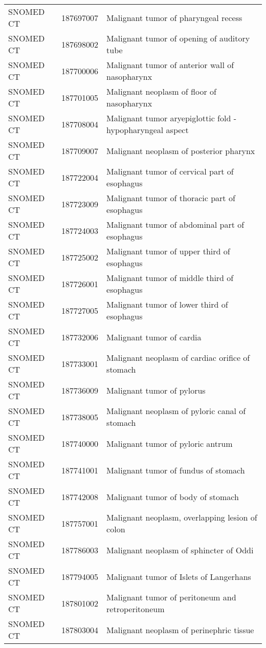 \begin{longtable}{p{}p{}p{}}
  SNOMED CT & 187697007 & Malignant tumor of pharyngeal recess \\ 
  SNOMED CT & 187698002 & Malignant tumor of opening of auditory tube \\ 
  SNOMED CT & 187700006 & Malignant tumor of anterior wall of nasopharynx \\ 
  SNOMED CT & 187701005 & Malignant neoplasm of floor of nasopharynx \\ 
  SNOMED CT & 187708004 & Malignant tumor aryepiglottic fold - hypopharyngeal aspect \\ 
  SNOMED CT & 187709007 & Malignant neoplasm of posterior pharynx \\ 
  SNOMED CT & 187722004 & Malignant tumor of cervical part of esophagus \\ 
  SNOMED CT & 187723009 & Malignant tumor of thoracic part of esophagus \\ 
  SNOMED CT & 187724003 & Malignant tumor of abdominal part of esophagus \\ 
  SNOMED CT & 187725002 & Malignant tumor of upper third of esophagus \\ 
  SNOMED CT & 187726001 & Malignant tumor of middle third of esophagus \\ 
  SNOMED CT & 187727005 & Malignant tumor of lower third of esophagus \\ 
  SNOMED CT & 187732006 & Malignant tumor of cardia \\ 
  SNOMED CT & 187733001 & Malignant neoplasm of cardiac orifice of stomach \\ 
  SNOMED CT & 187736009 & Malignant tumor of pylorus \\ 
  SNOMED CT & 187738005 & Malignant neoplasm of pyloric canal of stomach \\ 
  SNOMED CT & 187740000 & Malignant tumor of pyloric antrum \\ 
  SNOMED CT & 187741001 & Malignant tumor of fundus of stomach \\ 
  SNOMED CT & 187742008 & Malignant tumor of body of stomach \\ 
  SNOMED CT & 187757001 & Malignant neoplasm, overlapping lesion of colon \\ 
  SNOMED CT & 187786003 & Malignant neoplasm of sphincter of Oddi \\ 
  SNOMED CT & 187794005 & Malignant tumor of Islets of Langerhans \\ 
  SNOMED CT & 187801002 & Malignant tumor of peritoneum and retroperitoneum \\ 
  SNOMED CT & 187803004 & Malignant neoplasm of perinephric tissue \\ 

\end{longtable}
